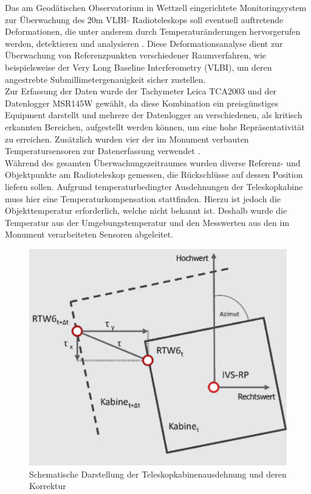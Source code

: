 Das am Geodätischen Observatorium in Wettzell eingerichtete Monitoringsystem zur Überwachung des 20m VLBI- Radioteleskops soll eventuell auftretende Deformationen, die unter anderem durch Temperaturänderungen hervorgerufen werden, detektieren und analysieren \cite{losler2010}. Diese Deformationsanalyse dient zur Überwachung von Referenzpunkten verschiedener Raumverfahren, wie beispielsweise der Very Long Baseline Interferometry (VLBI), um deren angestrebte Submillimetergenauigkeit sicher zustellen.\\
Zur Erfassung der Daten wurde der Tachymeter Leica TCA2003 und der Datenlogger MSR145W gewählt, da diese Kombination ein preisgünstiges Equipment darstellt und mehrere der Datenlogger an verschiedenen, als kritisch erkannten Bereichen, aufgestellt werden können, um eine hohe Repräsentativität zu erreichen. Zusätzlich wurden vier der im Monument verbauten Temperatursensoren zur Datenerfassung verwendet \cite{losler2010}.\\
Während des gesamten Überwachungszeitraumes wurden diverse Referenz- und Objektpunkte am Radioteleskop gemessen, die Rückschlüsse auf dessen Position liefern sollen. Aufgrund temperaturbedingter Ausdehnungen der Teleskopkabine muss hier eine Temperaturkompensation stattfinden. Hierzu ist jedoch die Objekttemperatur erforderlich, welche nicht bekannt ist. Deshalb wurde die Temperatur aus der Umgebungstemperatur und den Messwerten aus den im Monument verarbeiteten Sensoren abgeleitet.
\begin{figure}[h]
	\label{fig:Kabinenausdehnung}
	\centering
		\includegraphics[scale=2.0]{bilder/Kabinenausdehnung}
	\caption[Schematische Darstellung der Teleskopkabinenausdehnung und deren Korrektur]{Schematische Darstellung der Teleskopkabinenausdehnung und deren Korrektur\protect\footnotemark}
\end{figure}

